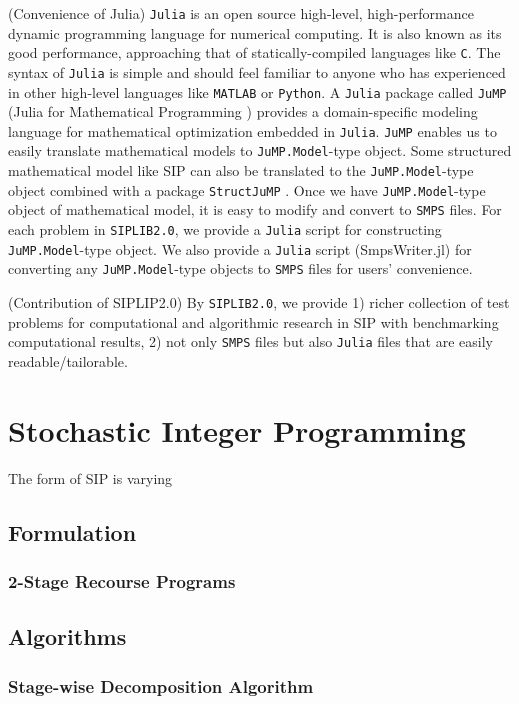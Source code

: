 (Convenience of Julia) \texttt{Julia} is an open source high-level, high-performance dynamic programming language for numerical computing. It is also known as its good performance, approaching that of statically-compiled languages like \texttt{C}. The syntax of \texttt{Julia} is simple and should feel familiar to anyone who has experienced in other high-level languages like \texttt{MATLAB} or \texttt{Python}. A \texttt{Julia} package called \texttt{JuMP} (Julia for Mathematical Programming \cite{web:JuMP}) provides a domain-specific modeling language for mathematical optimization embedded in \texttt{Julia}. \texttt{JuMP} enables us to easily translate mathematical models to \texttt{JuMP.Model}-type object. Some structured mathematical model like SIP can also be translated to the \texttt{JuMP.Model}-type object combined with a package \texttt{StructJuMP} \cite{web:StructJuMP}. Once we have \texttt{JuMP.Model}-type object of mathematical model, it is easy to modify and convert to \texttt{SMPS} files. For each problem in \texttt{SIPLIB2.0}, we provide a \texttt{Julia} script for constructing \texttt{JuMP.Model}-type object. We also provide a \texttt{Julia} script (SmpsWriter.jl) for converting any \texttt{JuMP.Model}-type objects to \texttt{SMPS} files for users' convenience.

(Contribution of SIPLIP2.0) By \texttt{SIPLIB2.0}, we provide 1) richer collection of test problems for computational and algorithmic research in SIP with benchmarking computational results, 2) not only \texttt{SMPS} files but also \texttt{Julia} files that are easily readable/tailorable.



\section{Stochastic Integer Programming}
The form of SIP is varying 
\subsection{Formulation}
\subsubsection{2-Stage Recourse Programs}


\subsection{Algorithms}
\subsubsection{Stage-wise Decomposition Algorithm}
